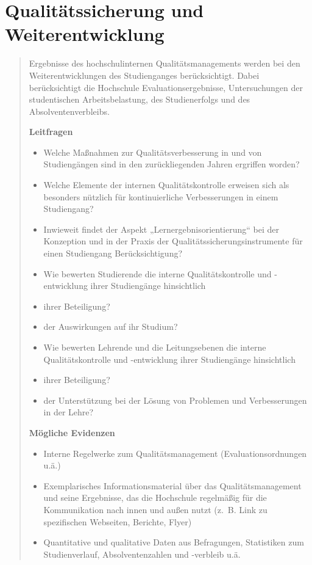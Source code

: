 \chapter{Qualitätssicherung und
Weiterentwicklung}\label{qualituxe4tssicherung-und-weiterentwicklung}

\begin{quote}
Ergebnisse des hochschulinternen Qualitätsmanagements werden bei den
Weiterentwicklungen des Studienganges berücksichtigt. Dabei
berücksichtigt die Hochschule Evaluationsergebnisse, Untersuchungen der
studentischen Arbeitsbelastung, des Studienerfolgs und des
Absolventenverbleibs.

\textbf{Leitfragen}

\begin{itemize}
\item
  Welche Maßnahmen zur Qualitätsverbesserung in und von Studiengängen
  sind in den zurückliegenden Jahren ergriffen worden?
\item
  Welche Elemente der internen Qualitätskontrolle erweisen sich als
  besonders nützlich für kontinuierliche Verbesserungen in einem
  Studiengang?
\item
  Inwieweit findet der Aspekt „Lernergebnisorientierung`` bei der
  Konzeption und in der Praxis der Qualitätssicherungsinstrumente für
  einen Studiengang Berücksichtigung?
\item
  Wie bewerten Studierende die interne Qualitätskontrolle und
  -entwicklung ihrer Studiengänge hinsichtlich
\item
  ihrer Beteiligung?
\item
  der Auswirkungen auf ihr Studium?
\item
  Wie bewerten Lehrende und die Leitungsebenen die interne
  Qualitätskontrolle und -entwicklung ihrer Studiengänge hinsichtlich
\item
  ihrer Beteiligung?
\item
  der Unterstützung bei der Lösung von Problemen und Verbesserungen in
  der Lehre?
\end{itemize}

\textbf{Mögliche Evidenzen}

\begin{itemize}
\item
  Interne Regelwerke zum Qualitätsmanagement (Evaluationsordnungen u.ä.)
\item
  Exemplarisches Informationsmaterial über das Qualitätsmanagement und
  seine Ergebnisse, das die Hochschule regelmäßig für die Kommunikation
  nach innen und außen nutzt (z.~B. Link zu spezifischen Webseiten,
  Berichte, Flyer)
\item
  Quantitative und qualitative Daten aus Befragungen, Statistiken zum
  Studienverlauf, Absolventenzahlen und -verbleib u.ä.
\end{itemize}
\end{quote}

